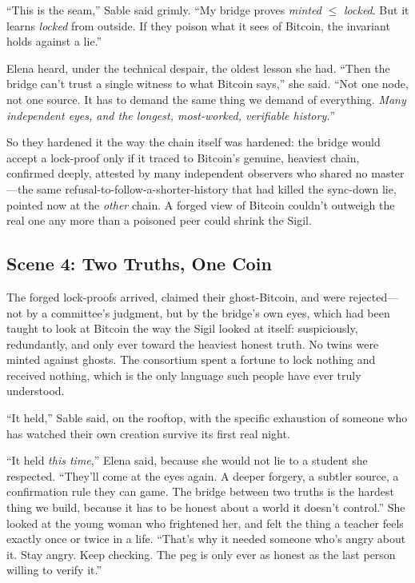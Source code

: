 ``This is the seam,'' Sable said grimly. ``My bridge proves \emph{minted} $\leq$
\emph{locked}. But it learns \emph{locked} from outside. If they poison what it
sees of Bitcoin, the invariant holds against a lie.''

Elena heard, under the technical despair, the oldest lesson she had. ``Then the
bridge can't trust a single witness to what Bitcoin says,'' she said. ``Not one
node, not one source. It has to demand the same thing we demand of everything.
\emph{Many independent eyes, and the longest, most-worked, verifiable history.}''

So they hardened it the way the chain itself was hardened: the bridge would accept
a lock-proof only if it traced to Bitcoin's genuine, heaviest chain, confirmed
deeply, attested by many independent observers who shared no master---the same
refusal-to-follow-a-shorter-history that had killed the sync-down lie, pointed
now at the \emph{other} chain. A forged view of Bitcoin couldn't outweigh the real
one any more than a poisoned peer could shrink the Sigil.

\hypertarget{scene-4-two-truths-one-coin}{%
\subsection{Scene 4: Two Truths, One
Coin}\label{scene-4-two-truths-one-coin}}

The forged lock-proofs arrived, claimed their ghost-Bitcoin, and were rejected---
not by a committee's judgment, but by the bridge's own eyes, which had been taught
to look at Bitcoin the way the Sigil looked at itself: suspiciously, redundantly,
and only ever toward the heaviest honest truth. No twins were minted against
ghosts. The consortium spent a fortune to lock nothing and received nothing, which
is the only language such people have ever truly understood.

``It held,'' Sable said, on the rooftop, with the specific exhaustion of someone
who has watched their own creation survive its first real night.

``It held \emph{this time},'' Elena said, because she would not lie to a student
she respected. ``They'll come at the eyes again. A deeper forgery, a subtler
source, a confirmation rule they can game. The bridge between two truths is the
hardest thing we build, because it has to be honest about a world it doesn't
control.'' She looked at the young woman who frightened her, and felt the thing a
teacher feels exactly once or twice in a life. ``That's why it needed someone who's
angry about it. Stay angry. Keep checking. The peg is only ever as honest as the
last person willing to verify it.''


